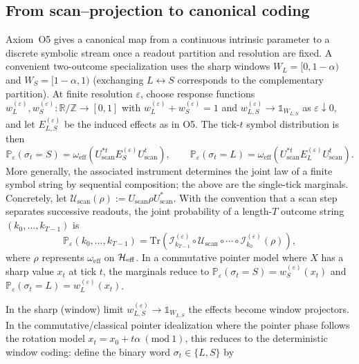 \subsection{From scan--projection to canonical coding}
Axiom~O5 gives a canonical map from a continuous intrinsic parameter to a discrete symbolic stream once a readout partition and resolution are fixed. A convenient two-outcome specialization uses the sharp windows $W_L=[0,1-\alpha)$ and $W_S=[1-\alpha,1)$ (exchanging $L\leftrightarrow S$ corresponds to the complementary partition). At finite resolution $\varepsilon$, choose response functions $w_L^{(\varepsilon)},w_S^{(\varepsilon)}:\mathbb{R}/\mathbb{Z}\to[0,1]$ with $w_L^{(\varepsilon)}+w_S^{(\varepsilon)}=1$ and $w_{L,S}^{(\varepsilon)}\to \mathds{1}_{W_{L,S}}$ as $\varepsilon\downarrow 0$, and let $E_{L,S}^{(\varepsilon)}$ be the induced effects as in O5. The tick-$t$ symbol distribution is then
\begin{equation}
    \mathbb{P}_{\varepsilon}(\sigma_t=S)=\omega_{\mathrm{eff}}\!\left(U_{\mathrm{scan}}^{*t} E_S^{(\varepsilon)} U_{\mathrm{scan}}^{t}\right),\qquad
    \mathbb{P}_{\varepsilon}(\sigma_t=L)=\omega_{\mathrm{eff}}\!\left(U_{\mathrm{scan}}^{*t} E_L^{(\varepsilon)} U_{\mathrm{scan}}^{t}\right).
\end{equation}
More generally, the associated instrument determines the joint law of a finite symbol string by sequential composition; the above are the single-tick marginals.
Concretely, let $\mathcal{U}_{\mathrm{scan}}(\rho):=U_{\mathrm{scan}}\rho U_{\mathrm{scan}}^{*}$. With the convention that a scan step separates successive readouts, the joint probability of a length-$T$ outcome string $(k_0,\dots,k_{T-1})$ is
\begin{equation}
    \mathbb{P}_{\varepsilon}(k_0,\dots,k_{T-1})
    =\mathrm{Tr}\!\left(
    \mathcal{I}_{k_{T-1}}^{(\varepsilon)}\circ \mathcal{U}_{\mathrm{scan}}\circ \cdots \circ
    \mathcal{I}_{k_{0}}^{(\varepsilon)}(\rho)\right),
\end{equation}
where $\rho$ represents $\omega_{\mathrm{eff}}$ on $\mathcal{H}_{\mathrm{eff}}$.
In a commutative pointer model where $X$ has a sharp value $x_t$ at tick $t$, the marginals reduce to $\mathbb{P}_{\varepsilon}(\sigma_t=S)=w_S^{(\varepsilon)}(x_t)$ and $\mathbb{P}_{\varepsilon}(\sigma_t=L)=w_L^{(\varepsilon)}(x_t)$.
\par
In the sharp (window) limit $w_{L,S}^{(\varepsilon)}\to \mathds{1}_{W_{L,S}}$ the effects become window projectors. In the commutative/classical pointer idealization where the pointer phase follows the rotation model $x_t=x_0+t\alpha\ (\mathrm{mod}\ 1)$, this reduces to the deterministic window coding: define the binary word $\sigma_t\in\{L,S\}$ by

